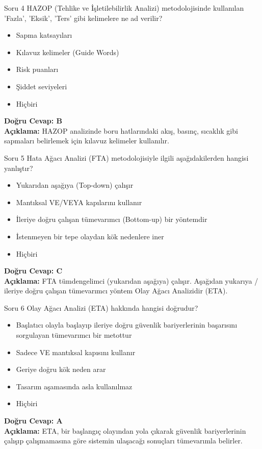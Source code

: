 \documentclass[12pt,a4paper]{article}
\begin{document}
\begin{testcard}{Soru 4}
    HAZOP (Tehlike ve İşletilebilirlik Analizi) metodolojisinde kullanılan 'Fazla', 'Eksik', 'Ters' gibi kelimelere ne ad verilir?
    \begin{itemize}
        \item[A)] Sapma katsayıları
        \item[B)] Kılavuz kelimeler (Guide Words)
        \item[C)] Risk puanları
        \item[D)] Şiddet seviyeleri
        \item[E)] Hiçbiri
    \end{itemize}
    \tcblower
    \textbf{Doğru Cevap: B} \\
    \textbf{Açıklama:} HAZOP analizinde boru hatlarındaki akış, basınç, sıcaklık gibi sapmaları belirlemek için kılavuz kelimeler kullanılır.
\end{testcard}

\begin{testcard}{Soru 5}
    Hata Ağacı Analizi (FTA) metodolojisiyle ilgili aşağıdakilerden hangisi yanlıştır?
    \begin{itemize}
        \item[A)] Yukarıdan aşağıya (Top-down) çalışır
        \item[B)] Mantıksal VE/VEYA kapılarını kullanır
        \item[C)] İleriye doğru çalışan tümevarımcı (Bottom-up) bir yöntemdir
        \item[D)] İstenmeyen bir tepe olaydan kök nedenlere iner
        \item[E)] Hiçbiri
    \end{itemize}
    \tcblower
    \textbf{Doğru Cevap: C} \\
    \textbf{Açıklama:} FTA tümdengelimci (yukarıdan aşağıya) çalışır. Aşağıdan yukarıya / ileriye doğru çalışan tümevarımcı yöntem Olay Ağacı Analizidir (ETA).
\end{testcard}

\begin{testcard}{Soru 6}
    Olay Ağacı Analizi (ETA) hakkında hangisi doğrudur?
    \begin{itemize}
        \item[A)] Başlatıcı olayla başlayıp ileriye doğru güvenlik bariyerlerinin başarısını sorgulayan tümevarımcı bir metottur
        \item[B)] Sadece VE mantıksal kapısını kullanır
        \item[C)] Geriye doğru kök neden arar
        \item[D)] Tasarım aşamasında asla kullanılmaz
        \item[E)] Hiçbiri
    \end{itemize}
    \tcblower
    \textbf{Doğru Cevap: A} \\
    \textbf{Açıklama:} ETA, bir başlangıç olayından yola çıkarak güvenlik bariyerlerinin çalışıp çalışmamasına göre sistemin ulaşacağı sonuçları tümevarımla belirler.
\end{testcard}
\end{document}
